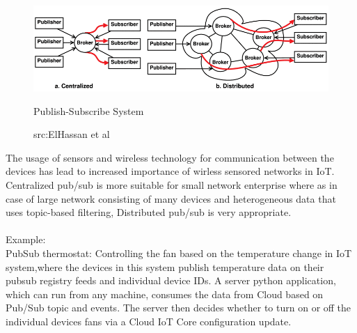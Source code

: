 \begin{figure}[H]
	\centering
	\includegraphics[width=\linewidth]{image/pub-sub.png}
	\caption{Publish-Subscribe System}
	\caption*{src:ElHassan et al\cite{4}}
\end{figure}

The usage of sensors and wireless technology for communication between the devices has lead to increased importance of wirless sensored networks in IoT.\\
Centralized pub/sub is more suitable for small network enterprise where as in case of large network consisting of many devices and heterogeneous data that uses topic-based filtering, Distributed pub/sub is very appropriate\cite{4}.\\ \\
Example:\\
PubSub thermostat: Controlling the fan based on the temperature change in IoT system,where the devices in this system publish temperature data on their pubsub registry feeds and individual device IDs. A server python application, which can run from any machine, consumes the data from Cloud based on Pub/Sub topic and events. The server then decides whether to turn on or off the individual devices fans via a Cloud IoT Core configuration update\cite{matthew}.
